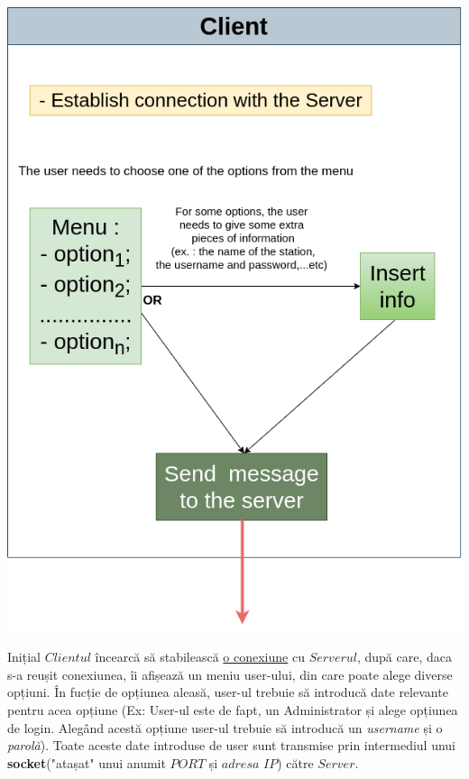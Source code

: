 \documentclass[runningheads]{llncs}
\begin{document}
	\begin{center}
		\includegraphics[scale=0.45]{diagram_client.png}
	\end{center}
	Inițial $Clientul$ încearcă să stabilească \hyperlink{sec:detailsConnect}{o conexiune} cu $Serverul$, după care, daca s-a reușit conexiunea, îi afișează un meniu user-ului, din care poate alege diverse opțiuni.
	În fucție de opțiunea aleasă, user-ul trebuie să introducă date relevante pentru acea opțiune 
	(Ex: User-ul este de fapt, un Administrator și alege opțiunea de login. Alegând acestă opțiune user-ul trebuie să introducă un \textit{username} și o \textit{parolă}).
	Toate aceste date introduse de user sunt transmise prin intermediul unui \textbf{socket}("atașat" unui anumit $PORT$ și $adresa$ $IP$) către $Server$.
	
\end{document}
